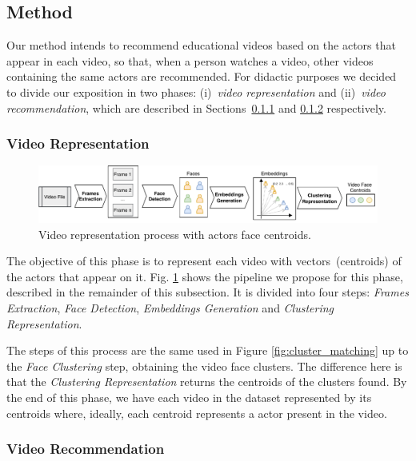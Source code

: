 \subsection{Method}
\label{sec:ism_method}

Our method intends to recommend educational videos based on the actors that appear in each video, so that, when a person watches a video, other videos containing the same actors are recommended.
For didactic purposes we decided to divide our exposition in two phases: (i)~\emph{video representation} and (ii)~\emph{video recommendation}, which are described in Sections~\ref{subsec:video_representation} and \ref{subsec:video_recommendation} respectively.

\subsubsection{Video Representation}
\label{subsec:video_representation}

\begin{figure}[!ht]
  \centering
  \includegraphics[width=\linewidth]{img/ism/video_clustering_line.pdf}
  \caption{Video representation process with actors face centroids. }
  \label{fig:video_clustering}
\end{figure}

The objective of this phase is to represent each video with vectors~(centroids) of the actors that appear on it. 
Fig. \ref{fig:video_clustering} shows the pipeline we propose for this phase, described in the remainder of this subsection.
It is divided into four steps: \emph{Frames Extraction}, \emph{Face Detection}, \emph{Embeddings Generation} and \emph{Clustering Representation}.

The steps of this process are the same used in Figure \ref{fig:cluster_matching} up to the \emph{Face Clustering} step, obtaining the video face clusters.
The difference here is that the \emph{Clustering Representation} returns the centroids of the clusters found.
By the end of this phase, we have each video in the dataset represented by its centroids where, ideally, each centroid represents a actor present in the video.


\subsubsection{Video Recommendation}
\label{subsec:video_recommendation}

